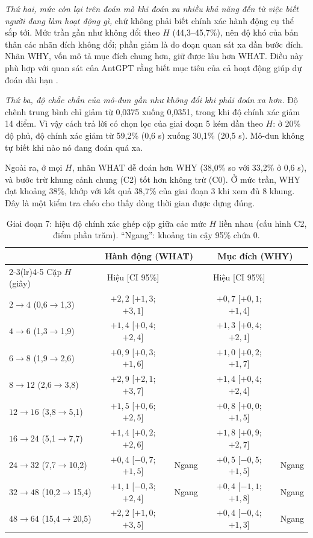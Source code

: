 \documentclass[a4paper,oneside]{report}
\begin{document}
\textit{Thứ hai, mức còn lại trên đoán mò khi đoán xa nhiều khả năng đến từ việc biết người đang làm hoạt động gì,} chứ không phải biết chính xác hành động cụ thể sắp tới. Mức trần gần như không đổi theo $H$ (44,3--45,7\%), nên độ khó của bản thân các nhãn đích không đổi; phần giảm là do đoạn quan sát xa dần bước đích. Nhãn WHY, vốn mô tả mục đích chung hơn, giữ được lâu hơn WHAT. Điều này phù hợp với quan sát của AntGPT rằng biết mục tiêu của cả hoạt động giúp dự đoán dài hạn \citep{zhao2024antgpt}.

\textit{Thứ ba, độ chắc chắn của mô-đun gần như không đổi khi phải đoán xa hơn.} Độ chênh trung bình chỉ giảm từ 0,0375 xuống 0,0351, trong khi độ chính xác giảm 14 điểm. Vì vậy cách trả lời có chọn lọc của giai đoạn 5 kém dần theo $H$: ở 20\% độ phủ, độ chính xác giảm từ 59,2\% (0,6 s) xuống 30,1\% (20,5 s). Mô-đun không tự biết khi nào nó đang đoán quá xa.

Ngoài ra, ở mọi $H$, nhãn WHAT dễ đoán hơn WHY (38,0\% so với 33,2\% ở 0,6 s), và bước trừ khung cảnh chung (C2) tốt hơn không trừ (C0). Ở mức trần, WHY đạt khoảng 38\%, khớp với kết quả 38,7\% của giai đoạn 3 khi xem đủ 8 khung. Đây là một kiểm tra chéo cho thấy dòng thời gian được dựng đúng.

\begin{table}[ht]
\centering
\caption{Giai đoạn 7: hiệu độ chính xác ghép cặp giữa các mức $H$ liền nhau (cấu hình C2, điểm phần trăm). ``Ngang'': khoảng tin cậy 95\% chứa 0.}
\label{tab:horizon_paired}
\small
\begin{tabular}{lcccc}
\toprule
& \multicolumn{2}{c}{Hành động (WHAT)} & \multicolumn{2}{c}{Mục đích (WHY)} \\
\cmidrule(lr){2-3}\cmidrule(lr){4-5}
Cặp $H$ (giây) & Hiệu [CI 95\%] & & Hiệu [CI 95\%] & \\
\midrule
$2\to4$ (0,6$\to$1,3)    & $+2{,}2$ [$+1{,}3$; $+3{,}1$] & & $+0{,}7$ [$+0{,}1$; $+1{,}4$] & \\
$4\to6$ (1,3$\to$1,9)    & $+1{,}4$ [$+0{,}4$; $+2{,}4$] & & $+1{,}3$ [$+0{,}4$; $+2{,}1$] & \\
$6\to8$ (1,9$\to$2,6)    & $+0{,}9$ [$+0{,}3$; $+1{,}6$] & & $+1{,}0$ [$+0{,}2$; $+1{,}7$] & \\
$8\to12$ (2,6$\to$3,8)   & $+2{,}9$ [$+2{,}1$; $+3{,}7$] & & $+1{,}4$ [$+0{,}4$; $+2{,}4$] & \\
$12\to16$ (3,8$\to$5,1)  & $+1{,}5$ [$+0{,}6$; $+2{,}5$] & & $+0{,}8$ [$+0{,}0$; $+1{,}5$] & \\
$16\to24$ (5,1$\to$7,7)  & $+1{,}4$ [$+0{,}2$; $+2{,}6$] & & $+1{,}8$ [$+0{,}9$; $+2{,}7$] & \\
$24\to32$ (7,7$\to$10,2) & $+0{,}4$ [$-0{,}7$; $+1{,}5$] & Ngang & $+0{,}5$ [$-0{,}5$; $+1{,}5$] & Ngang \\
$32\to48$ (10,2$\to$15,4)& $+1{,}1$ [$-0{,}3$; $+2{,}4$] & Ngang & $+0{,}4$ [$-1{,}1$; $+1{,}8$] & Ngang \\
$48\to64$ (15,4$\to$20,5)& $+2{,}2$ [$+1{,}0$; $+3{,}5$] & & $+0{,}4$ [$-0{,}4$; $+1{,}3$] & Ngang \\
\bottomrule
\end{tabular}
\end{table}
\end{document}
